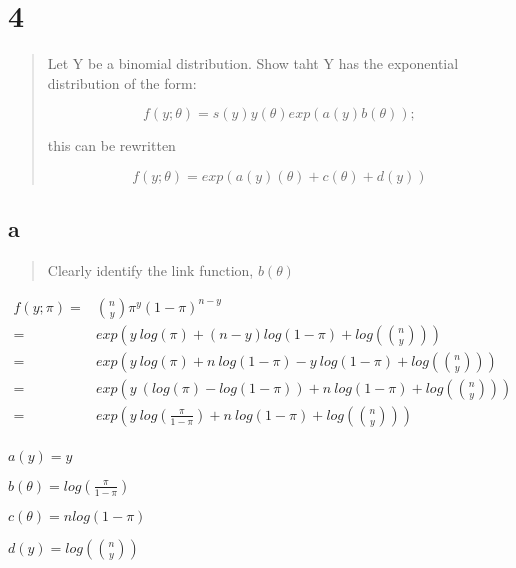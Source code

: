 \documentclass[11pt]{article}
\begin{document}
\section{4}
\label{sec:org27b0f3b}
\begin{quote}
Let Y be a binomial distribution. Show taht Y has the exponential distribution
of the form:

$$
f(y; \theta) = s(y) y(\theta) exp(a(y) b(\theta));
$$

this can be rewritten

$$
f(y; \theta) = exp(a(y) (\theta) + c(\theta) + d(y))
$$
\end{quote}


\subsection{a}
\label{sec:org5fb5e36}
\begin{quote}
Clearly identify the link function, \(b(\theta)\)
\end{quote}

\begin{equation}
\begin{split}
f(y; \pi) = & {n \choose y} \pi^y (1 - \pi)^{n - y}\\
= & exp(y \ log(\pi) + (n - y) log(1 - \pi) + log({n \choose y}))\\
= & exp(y \ log (\pi) + n \ log(1 - \pi) - y \ log(1 - \pi) + log({n \choose y}))\\
= & exp(y \ (log(\pi) - log(1 - \pi)) + n \ log (1 - \pi) + log({n \choose y}))\\
= & exp(y \ log(\frac{\pi}{1 - \pi}) + n \ log (1 - \pi) + log({n \choose y}))\\
\end{split}
\end{equation}

\(a(y) = y\)

\(b(\theta) = log(\frac{\pi}{1 - \pi})\)

\(c(\theta) = n log(1 - \pi)\)

\(d(y) = log({n \choose y})\)
\end{document}
